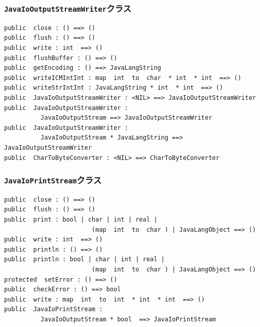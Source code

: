 \documentclass[\pformat,12pt]{jarticle}
\begin{document}
\subsubsection{\texttt{JavaIoOutputStreamWriter}クラス}
\begin{small}
\begin{verbatim}
public  close : () ==> ()
public  flush : () ==> ()
public  write : int  ==> ()
public  flushBuffer : () ==> ()
public  getEncoding : () ==> JavaLangString
public  writeICMIntInt : map  int  to  char  * int  * int  ==> ()
public  writeStrIntInt : JavaLangString * int  * int  ==> ()
public  JavaIoOutputStreamWriter : <NIL> ==> JavaIoOutputStreamWriter
public  JavaIoOutputStreamWriter : 
          JavaIoOutputStream ==> JavaIoOutputStreamWriter
public  JavaIoOutputStreamWriter : 
          JavaIoOutputStream * JavaLangString ==> JavaIoOutputStreamWriter
public  CharToByteConverter : <NIL> ==> CharToByteConverter
\end{verbatim}
\end{small}

\subsubsection{\texttt{JavaIoPrintStream}クラス}
\begin{small}
\begin{verbatim}
public  close : () ==> ()
public  flush : () ==> ()
public  print : bool | char | int | real | 
                        (map  int  to  char ) | JavaLangObject ==> ()
public  write : int  ==> ()
public  println : () ==> ()
public  println : bool | char | int | real | 
                        (map  int  to  char ) | JavaLangObject ==> ()
protected  setError : () ==> ()
public  checkError : () ==> bool
public  write : map  int  to  int  * int  * int  ==> ()
public  JavaIoPrintStream : 
          JavaIoOutputStream * bool  ==> JavaIoPrintStream
\end{verbatim}
\end{small}
\end{document}
